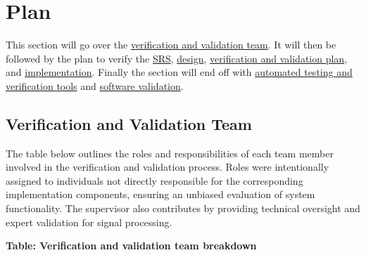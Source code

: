 \documentclass[12pt, titlepage]{article}
\begin{document}
\section{Plan}

This section will go over the \hyperref[sec:vnv_team]{verification and
validation team}. It will then be followed by the plan to verify the
\hyperref[sec:srs_verification]{SRS},
\hyperref[sec:design_verification]{design},
\hyperref[sec:vnv_plan_verification]{verification and validation plan}, and
\hyperref[sec:implementation_verification]{implementation}. Finally the section
will end off with \hyperref[sec:testing_tools]{automated testing and
verification tools} and \hyperref[sec:software_validation]{software validation}.

\subsection{Verification and Validation Team}\label{sec:vnv_team}

The table below outlines the roles and responsibilities of each team member
involved in the verification and validation process. Roles were intentionally
assigned to individuals not directly responsible for the corresponding
implementation components, ensuring an unbiased evaluation of system
functionality. The supervisor also contributes by providing technical oversight
and expert validation for signal processing.

\noindent
\textbf{Table: Verification and validation team breakdown}
\label{table:vnv_team}
\end{document}
